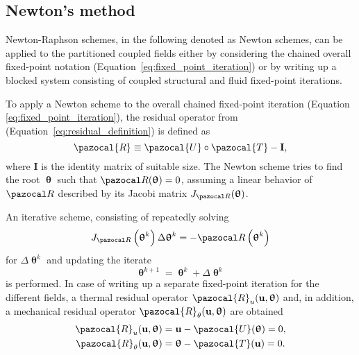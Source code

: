 \subsection{Newton's method}

Newton-Raphson schemes, in the following denoted as Newton schemes, can be applied to the partitioned coupled fields either by considering the chained overall fixed-point notation (Equation~\eqref{eq:fixed_point_iteration}) or by writing up a blocked system consisting of coupled structural and fluid fixed-point iterations.

To apply a Newton scheme to the overall chained fixed-point iteration (Equation \eqref{eq:fixed_point_iteration}), the residual operator from (Equation~\eqref{eq:residual_definition}) is defined as
\begin{equation} \label{eq:residual_fixed_point}
\pazocal{R}\equiv\pazocal{U} \circ \pazocal {T}-\mathbf{I},
\end{equation}
where $\mathbf{I}$ is the identity matrix of suitable size.
The Newton scheme tries to find the root $\bm \uptheta$ such that $\pazocal R(\bm \uptheta)=0$, assuming a linear behavior of $\pazocal R$ described by its Jacobi matrix $J_{\pazocal R}(\bm \uptheta)$.

An iterative scheme, consisting of repeatedly solving
\begin{equation} \label{eq:newton_raphson}
J_{\pazocal R}\left(\bm \uptheta^{k}\right) \Delta \bm \uptheta^{k}=-\pazocal R\left(\bm \uptheta^{k}\right)
\end{equation}
for $\Delta \bm \uptheta^{k}$ and updating the iterate
\begin{equation}
\bm \uptheta^{k+1}= \bm \uptheta^{k}+\Delta \bm \uptheta^{k}
\end{equation}
is performed.
In case of writing up a separate fixed-point iteration for the different fields, a thermal residual operator $\pazocal{R}_{u}(\mathbf{u}, \bm{\uptheta})$ and, in addition, a mechanical residual operator $\pazocal{R}_{\theta}(\mathbf{u}, \bm{\uptheta})$ are obtained
\begin{gather}
\pazocal{R}_{u}(\mathbf{u}, \bm{\uptheta})=\mathbf{u}-\pazocal{U}(\bm{\uptheta})=0, \\
\pazocal{R}_{\theta}(\mathbf{u}, \bm{\uptheta})=\bm{\uptheta}-\pazocal{T}(\mathbf{u})=0.
\end{gather}

